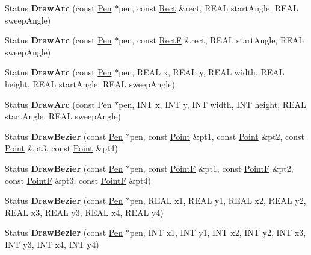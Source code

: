 \begin{DoxyCompactItemize}
Status {\bfseries Draw\+Arc} (const \hyperlink{class_pen}{Pen} $\ast$pen, const \hyperlink{struct_rect}{Rect} \&rect, R\+E\+AL start\+Angle, R\+E\+AL sweep\+Angle)
\item 
\mbox{\label{class_graphics_ac593fbd38229fba699dccc7f66366bd0}} 
Status {\bfseries Draw\+Arc} (const \hyperlink{class_pen}{Pen} $\ast$pen, const \hyperlink{struct_rect_f}{RectF} \&rect, R\+E\+AL start\+Angle, R\+E\+AL sweep\+Angle)
\item 
\mbox{\label{class_graphics_a2237ccb9b7dd94834312c68aee04bbbc}} 
Status {\bfseries Draw\+Arc} (const \hyperlink{class_pen}{Pen} $\ast$pen, R\+E\+AL x, R\+E\+AL y, R\+E\+AL width, R\+E\+AL height, R\+E\+AL start\+Angle, R\+E\+AL sweep\+Angle)
\item 
\mbox{\label{class_graphics_acd104e437ab886c3efb43c5ab4eebbed}} 
Status {\bfseries Draw\+Arc} (const \hyperlink{class_pen}{Pen} $\ast$pen, I\+NT x, I\+NT y, I\+NT width, I\+NT height, R\+E\+AL start\+Angle, R\+E\+AL sweep\+Angle)
\item 
\mbox{\label{class_graphics_aa27b653aea790fbb4b6b3e8aecd76fb2}} 
Status {\bfseries Draw\+Bezier} (const \hyperlink{class_pen}{Pen} $\ast$pen, const \hyperlink{struct_point}{Point} \&pt1, const \hyperlink{struct_point}{Point} \&pt2, const \hyperlink{struct_point}{Point} \&pt3, const \hyperlink{struct_point}{Point} \&pt4)
\item 
\mbox{\label{class_graphics_a0cc7a62176bfb037e2f5bb93f8febd69}} 
Status {\bfseries Draw\+Bezier} (const \hyperlink{class_pen}{Pen} $\ast$pen, const \hyperlink{struct_point_f}{PointF} \&pt1, const \hyperlink{struct_point_f}{PointF} \&pt2, const \hyperlink{struct_point_f}{PointF} \&pt3, const \hyperlink{struct_point_f}{PointF} \&pt4)
\item 
\mbox{\label{class_graphics_ae56d49be074eabb2e52b66f0d17fd39d}} 
Status {\bfseries Draw\+Bezier} (const \hyperlink{class_pen}{Pen} $\ast$pen, R\+E\+AL x1, R\+E\+AL y1, R\+E\+AL x2, R\+E\+AL y2, R\+E\+AL x3, R\+E\+AL y3, R\+E\+AL x4, R\+E\+AL y4)
\item 
\mbox{\label{class_graphics_aa895d4c678ee22c950962d0e5df41f1e}} 
Status {\bfseries Draw\+Bezier} (const \hyperlink{class_pen}{Pen} $\ast$pen, I\+NT x1, I\+NT y1, I\+NT x2, I\+NT y2, I\+NT x3, I\+NT y3, I\+NT x4, I\+NT y4)

\end{DoxyCompactItemize}

